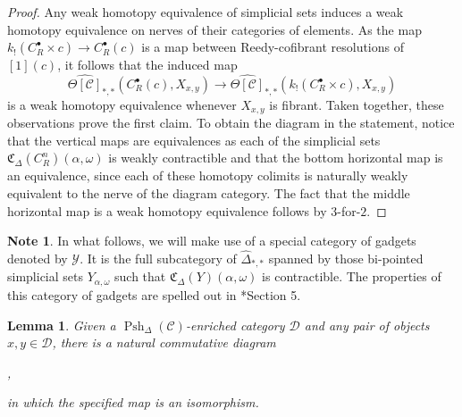 \documentclass[a4paper]{article}
\numberwithin{equation}{subsection}
\theoremstyle{plain}   %
\newtheorem{lemma}[equation]{Lemma}
\theoremstyle{definition}
\newtheorem{note}[equation]{Note}
\theoremstyle{remark}
\theoremstyle{plain}
\DeclareMathOperator*{\coliml}{colim}
\newcommand{\Nec}{\ensuremath{{\mathcal{N}ec}}}
\newcommand{\overcat}[2]{{\left(#1\downarrow #2\right)}}
\newcommand{\psh}[1]{\ensuremath{\widehat{#1}}}
\newcommand{\cellset}{\ensuremath{\widehat{\Theta[\mathcal{C}]}}}
\newcommand{\spsh}{\ensuremath{\operatorname{Psh}_\Delta(\mathcal{C})}}
\begin{document}
\begin{proof}
	Any weak homotopy equivalence of simplicial sets induces a weak homotopy equivalence on nerves of their categories of elements.  As the map \(k_!(C^\bullet_R\times c)\to C^\bullet_R(c)\) is a map between Reedy-cofibrant resolutions of \([1](c)\), it follows that the induced map 
	\[
		\cellset_{\ast,\ast}(C^\bullet_R(c), X_{x,y}) \to \cellset_{\ast,\ast}(k_!(C^\bullet_R\times c), X_{x,y})
	\]
	is a weak homotopy equivalence whenever \(X_{x,y}\) is fibrant.  Taken together, these observations prove the first claim.  To obtain the diagram in the statement, notice that the vertical maps are equivalences as each of the simplicial sets \(\mathfrak{C}_\Delta(C^n_R)(\alpha,\omega)\) is weakly contractible and that the bottom horizontal map is an equivalence, since each of these homotopy colimits is naturally weakly equivalent to the nerve of the diagram category.  The fact that the middle horizontal map is a weak homotopy equivalence follows by \(3\)-for-\(2\).
\end{proof}
\begin{note}
	In what follows, we will make use of a special category of gadgets denoted by \(\mathcal{Y}\).  It is the full subcategory of \(\psh{\Delta}_{\ast,\ast}\) spanned by those bi-pointed simplicial sets \(Y_{\alpha,\omega}\) such that \(\mathfrak{C}_\Delta(Y)(\alpha,\omega)\) is contractible.  The properties of this category of gadgets are spelled out in \cite{ds2}*{Section 5}.
\end{note}
\begin{lemma}\label{dssquare2}
	Given a \(\spsh\)-enriched category \(\mathcal{D}\) and any pair of objects \(x,y\in \mathcal{D}\), there is a natural commutative diagram
	\begin{center}
		,
	\end{center}
	in which the specified map is an isomorphism.
\end{lemma}
\end{document}

